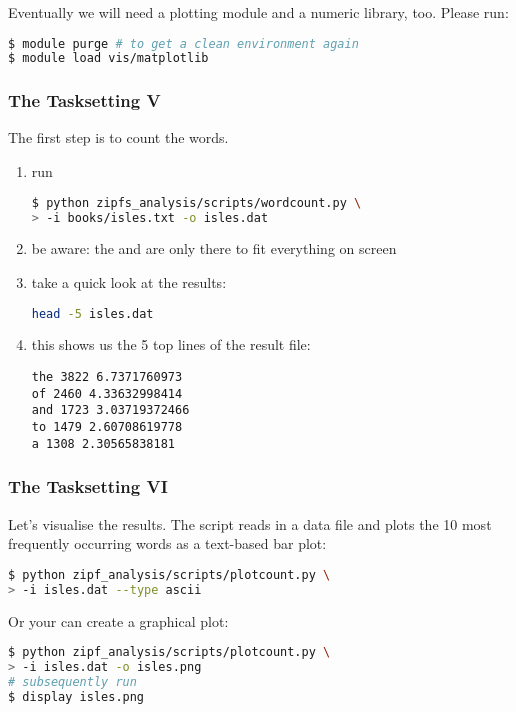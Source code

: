 
\begin{frame}[fragile]
  \frametitle{}
  Eventually we will need a plotting module and a numeric library, too. Please run:
  \begin{lstlisting}[language=Bash, style=Shell]
$ module purge # to get a clean environment again
$ module load vis/matplotlib
  \end{lstlisting}
  \pause
\end{frame}

\begin{frame}[fragile]
  \frametitle{The Tasksetting V}
  The first step is to count the words.\newline
  \begin{enumerate}
   \item run \begin{lstlisting}[language=Bash, style=Shell, basicstyle=\footnotesize] 
$ python zipfs_analysis/scripts/wordcount.py \
> -i books/isles.txt -o isles.dat           
             \end{lstlisting}
  \item be aware: the \altverb{\\} and \altverb{>} are only there to fit everything on screen
  \item take a quick look at the results:
        \begin{lstlisting}[language=Bash, style=Shell] 
head -5 isles.dat
        \end{lstlisting}
  \item this shows us the 5 top lines of the result file:
  \begin{lstlisting}[style=Plain]
the 3822 6.7371760973
of 2460 4.33632998414
and 1723 3.03719372466
to 1479 2.60708619778
a 1308 2.30565838181
  \end{lstlisting}
   \end{enumerate}
\end{frame}

\begin{frame}[fragile]
  \frametitle{The Tasksetting VI}
  Let’s visualise the results. The script  reads in a data file and plots the 10 most frequently occurring words as a text-based bar plot:
  \begin{lstlisting}[language=Bash, style=Shell] 
$ python zipf_analysis/scripts/plotcount.py \
> -i isles.dat --type ascii
  \end{lstlisting}
  \pause
  Or your can create a graphical plot:
  \begin{lstlisting}[language=Bash, style=Shell] 
$ python zipf_analysis/scripts/plotcount.py \
> -i isles.dat -o isles.png
# subsequently run
$ display isles.png
  \end{lstlisting}
\end{frame}

